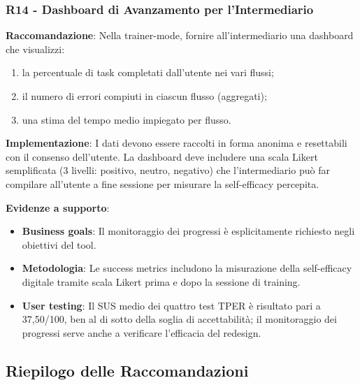 \documentclass[11pt,a4paper]{article}
\begin{document}
\subsubsection{R14 - Dashboard di Avanzamento per l'Intermediario}
\label{rec:R14}

\textbf{Raccomandazione}: Nella trainer-mode, fornire all'intermediario una
dashboard che visualizzi:
\begin{enumerate}
    \item la percentuale di task completati dall'utente nei vari flussi;
    \item il numero di errori compiuti in ciascun flusso (aggregati);
    \item una stima del tempo medio impiegato per flusso.
\end{enumerate}

\textbf{Implementazione}: I dati devono essere raccolti in forma anonima
e resettabili con il consenso dell'utente. La dashboard deve includere una
scala Likert semplificata (3 livelli: positivo, neutro, negativo) che l'intermediario pu\`o far
compilare all'utente a fine sessione per misurare la self-efficacy percepita.

\textbf{Evidenze a supporto}:
\begin{itemize}
    \item \textbf{Business goals}: Il monitoraggio dei progressi \`e esplicitamente
    richiesto negli obiettivi del tool.
    \item \textbf{Metodologia}: Le success metrics includono la misurazione
    della self-efficacy digitale tramite scala Likert prima e dopo la sessione
    di training.
    \item \textbf{User testing}: Il SUS medio dei quattro test TPER \`e risultato
    pari a 37,50/100, ben al di sotto della soglia di accettabilit\`a; il
    monitoraggio dei progressi serve anche a verificare l'efficacia del redesign.
\end{itemize}


\newpage
\subsection{Riepilogo delle Raccomandazioni}
\end{document}

